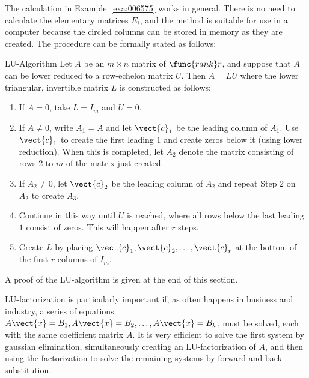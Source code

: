 The calculation in Example~\ref{exa:006575} works in general. There is no need to calculate the elementary matrices $E_{i}$, and the method is suitable for use in a computer because the circled columns can be stored in memory as they are created. The procedure can be formally stated as follows:

\begin{theorem*}[label=thm:006589]{LU-Algorithm}
Let $A$ be an $m \times n$ matrix of $\func{rank }r$, and suppose that $A$ can be lower reduced to a row-echelon matrix $U$. Then $A = LU$ where the lower triangular, invertible matrix $L$ is constructed as follows:

\begin{enumerate}
\item If $A = 0$, take $L = I_{m}$ and $U = 0$.

\item If $A \neq 0$, write $A_{1} = A$ and let $\vect{c}_{1}$ be the leading column of $A_{1}$. Use $\vect{c}_{1}$ to create the first leading $1$ and create zeros below it (using lower reduction). When this is completed, let $A_{2}$ denote the matrix consisting of rows 2 to $m$ of the matrix just created.

\item If $A_{2} \neq 0$, let $\vect{c}_{2}$ be the leading column of $A_{2}$ and repeat Step 2 on $A_{2}$ to create $A_{3}$.

\item Continue in this way until $U$ is reached, where all rows below the last leading $1$ consist of zeros. This will happen after $r$ steps.

\item Create $L$ by placing $\vect{c}_{1}, \vect{c}_{2}, \dots, \vect{c}_{r}$ at the bottom of the first $r$ columns of $I_{m}$.

\end{enumerate}
\end{theorem*}

\noindent A proof of the LU-algorithm is given at the end of this section.

\newpage

LU-factorization is particularly important if, as often happens in business and industry, a series of equations $A\vect{x} = B_{1}, A\vect{x} = B_{2}, \dots, A\vect{x} = B_{k}$, must be solved, each with the same coefficient matrix $A$. It is very efficient to solve the first system by gaussian elimination, simultaneously creating an LU-factorization of $A$, and then using the factorization to solve the remaining systems by forward and back substitution.

